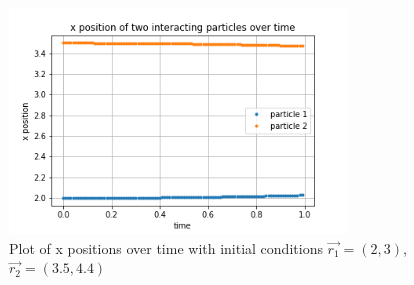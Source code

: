 \documentclass{article}
\begin{document}
\begin{figure}[H]
	\centering
	\includegraphics[width=0.8\textwidth]{../images/q2_iii_xpos.png}
	\caption{Plot of x positions over time with initial conditions $\vec{r_1}=(2,3)$, $\vec{r_2}=(3.5,4.4)$}
	\label{fig:q2_iii_xpos}
\end{figure}
\end{document}
